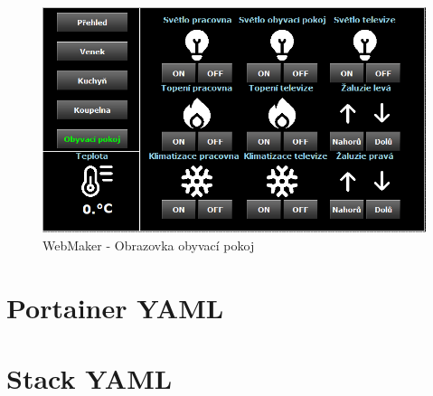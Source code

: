 \begin{figure}[!ht]
  \begin{center}
  \includegraphics[scale=0.8]{obrazky/Obyvaci_pokoj.png}
  \end{center}
  \caption[WebMaker - Obrazovka obyvací pokoj]{WebMaker - Obrazovka obyvací pokoj}
  \label{fig:obyvak}
\end{figure}
\chapter{Portainer YAML}
\label{apend:portainer}
\chapter{Stack YAML}
\label{apend:stackyaml}
